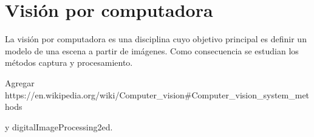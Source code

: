 
\section{Visión por computadora}

La visión por computadora es una disciplina cuyo objetivo principal es definir
un modelo de una escena a partir de imágenes\cite{cvLinda2001}. Como
consecuencia se estudian los métodos captura y procesamiento.

Agregar
https://en.wikipedia.org/wiki/Computer_vision#Computer_vision_system_methods

y digitalImageProcessing2ed.
